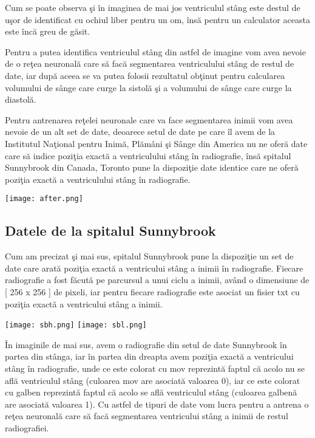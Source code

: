 Cum se poate observa \c{s}i \^{i}n imaginea de mai jos ventriculul st\^{a}ng este destul de u\c{s}or de identificat cu ochiul liber pentru un om, \^{i}ns\u{a} pentru un calculator aceasta este \^{i}nc\u{a} greu de g\u{a}sit.

\par

Pentru a putea identifica ventriculul st\^{a}ng din astfel de imagine vom avea nevoie de o re\c{t}ea neuronal\u{a} care s\u{a} fac\u{a} segmentarea ventriculului st\^{a}ng de restul de date, iar dup\u{a} aceea se va putea folosii rezultatul ob\c{t}inut pentru calcularea volumului de s\^{a}nge care curge la sistol\u{a} \c{s}i a volumului de s\^{a}nge care curge la diastol\u{a}.

\par

Pentru antrenarea re\c{t}elei neuronale care va face segmentarea inimii vom avea nevoie de un alt set de date, deoarece setul de date pe care \^{i}l avem de la Institutul Na\c{t}ional pentru Inim\u{a}, Pl\u{a}m\^{a}ni \c{s}i S\^{a}nge din America nu ne ofer\u{a} date care s\u{a} indice pozi\c{t}ia exact\u{a} a ventriculului st\^{a}ng \^{i}n radiografie, \^{i}ns\u{a} spitalul Sunnybrook din Canada, Toronto pune la dispozi\c{t}ie date identice care ne ofer\u{a} pozi\c{t}ia exact\u{a} a ventriculului st\^{a}ng \^{i}n radiografie.

\begin{center}
\texttt{[image: after.png]}
\end{center}

\subsection{Datele de la spitalul Sunnybrook}

Cum am precizat \c{s}i mai sus, spitalul Sunnybrook pune la dispozi\c{t}ie un set de date care arat\u{a} pozi\c{t}ia exact\u{a} a ventricului st\^{a}ng a inimii \^{i}n radiografie. Fiecare radiografie a fost f\u{a}cut\u{a} pe parcursul a unui ciclu a inimii, av\^{a}nd o dimensiune de [ 256 x 256 ] de pixeli, iar pentru fiecare radiografie este asociat  un fisier txt cu pozi\c{t}ia exact\u{a} a ventricului st\^{a}ng a inimii.

\begin{center}
\texttt{[image: sbh.png]}
\texttt{[image: sbl.png]}
\end{center}

\^{I}n imaginile de mai sus, avem o radiografie din setul de date Sunnybrook \^{i}n partea din st\^{a}nga, iar \^{i}n partea din dreapta avem pozi\c{t}ia exact\u{a} a ventricului st\^{a}ng \^{i}n radiografie, unde ce este colorat cu mov reprezint\u{a} faptul c\u{a} acolo nu se afl\u{a} ventriculul st\^{a}ng (culoarea mov are asociat\u{a} valoarea 0), iar ce este colorat cu galben reprezint\u{a} faptul c\u{a} acolo se afl\u{a} ventriculul st\^{a}ng (culoarea galben\u{a} are asociat\u{a} valoarea 1). Cu astfel de tipuri de date vom lucra pentru a antrena o re\c{t}ea neuronal\u{a} care s\u{a} fac\u{a} segmentarea ventricului st\^{a}ng a inimii de restul radiografiei. 

